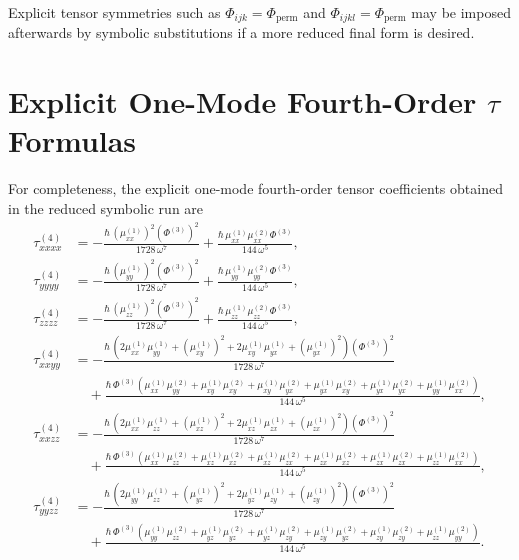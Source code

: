 \documentclass[11pt,a4paper]{article}
\begin{document}
Explicit tensor symmetries such as
\(\Phi_{ijk}=\Phi_{\mathrm{perm}}\) and \(\Phi_{ijkl}=\Phi_{\mathrm{perm}}\)
may be imposed afterwards by symbolic substitutions if a more reduced final form is desired.

\appendix
\section{Explicit One-Mode Fourth-Order \texorpdfstring{$\tau$}{tau} Formulas}
\label{app:onemode}
For completeness, the explicit one-mode fourth-order tensor coefficients obtained in the reduced
symbolic run are
\begin{align}
\tau_{xxxx}^{(4)} &=
-\frac{\hbar\,\left(\mu_{xx}^{(1)}\right)^2\left(\Phi^{(3)}\right)^2}{1728\,\omega^7}
+\frac{\hbar\,\mu_{xx}^{(1)}\mu_{xx}^{(2)}\Phi^{(3)}}{144\,\omega^5},\\
\tau_{yyyy}^{(4)} &=
-\frac{\hbar\,\left(\mu_{yy}^{(1)}\right)^2\left(\Phi^{(3)}\right)^2}{1728\,\omega^7}
+\frac{\hbar\,\mu_{yy}^{(1)}\mu_{yy}^{(2)}\Phi^{(3)}}{144\,\omega^5},\\
\tau_{zzzz}^{(4)} &=
-\frac{\hbar\,\left(\mu_{zz}^{(1)}\right)^2\left(\Phi^{(3)}\right)^2}{1728\,\omega^7}
+\frac{\hbar\,\mu_{zz}^{(1)}\mu_{zz}^{(2)}\Phi^{(3)}}{144\,\omega^5},\\
\tau_{xxyy}^{(4)} &=
-\frac{\hbar\,\left(2\mu_{xx}^{(1)}\mu_{yy}^{(1)}+\left(\mu_{xy}^{(1)}\right)^2+2\mu_{xy}^{(1)}\mu_{yx}^{(1)}+\left(\mu_{yx}^{(1)}\right)^2\right)\left(\Phi^{(3)}\right)^2}{1728\,\omega^7}\nonumber\\
&\quad +\frac{\hbar\,\Phi^{(3)}\left(\mu_{xx}^{(1)}\mu_{yy}^{(2)}+\mu_{xy}^{(1)}\mu_{xy}^{(2)}+\mu_{xy}^{(1)}\mu_{yx}^{(2)}+\mu_{yx}^{(1)}\mu_{xy}^{(2)}+\mu_{yx}^{(1)}\mu_{yx}^{(2)}+\mu_{yy}^{(1)}\mu_{xx}^{(2)}\right)}{144\,\omega^5},\\
\tau_{xxzz}^{(4)} &=
-\frac{\hbar\,\left(2\mu_{xx}^{(1)}\mu_{zz}^{(1)}+\left(\mu_{xz}^{(1)}\right)^2+2\mu_{xz}^{(1)}\mu_{zx}^{(1)}+\left(\mu_{zx}^{(1)}\right)^2\right)\left(\Phi^{(3)}\right)^2}{1728\,\omega^7}\nonumber\\
&\quad +\frac{\hbar\,\Phi^{(3)}\left(\mu_{xx}^{(1)}\mu_{zz}^{(2)}+\mu_{xz}^{(1)}\mu_{xz}^{(2)}+\mu_{xz}^{(1)}\mu_{zx}^{(2)}+\mu_{zx}^{(1)}\mu_{xz}^{(2)}+\mu_{zx}^{(1)}\mu_{zx}^{(2)}+\mu_{zz}^{(1)}\mu_{xx}^{(2)}\right)}{144\,\omega^5},\\
\tau_{yyzz}^{(4)} &=
-\frac{\hbar\,\left(2\mu_{yy}^{(1)}\mu_{zz}^{(1)}+\left(\mu_{yz}^{(1)}\right)^2+2\mu_{yz}^{(1)}\mu_{zy}^{(1)}+\left(\mu_{zy}^{(1)}\right)^2\right)\left(\Phi^{(3)}\right)^2}{1728\,\omega^7}\nonumber\\
&\quad +\frac{\hbar\,\Phi^{(3)}\left(\mu_{yy}^{(1)}\mu_{zz}^{(2)}+\mu_{yz}^{(1)}\mu_{yz}^{(2)}+\mu_{yz}^{(1)}\mu_{zy}^{(2)}+\mu_{zy}^{(1)}\mu_{yz}^{(2)}+\mu_{zy}^{(1)}\mu_{zy}^{(2)}+\mu_{zz}^{(1)}\mu_{yy}^{(2)}\right)}{144\,\omega^5}.
\end{align}
\end{document}
